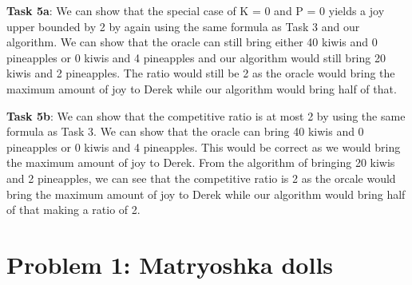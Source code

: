\documentclass[12pt,letterpaper]{article}
\begin{document}
\textbf{Task 5a}: We can show that the special case of K = 0 and P = 0 yields a joy upper
bounded by 2 by again using the same formula as Task 3 and our algorithm. We can show that
the oracle can still bring either 40 kiwis and 0 pineapples or 0 kiwis and 4 pineapples and our
algorithm would still bring 20 kiwis and 2 pineapples. The ratio would still be 2 as the oracle
would bring the maximum amount of joy to Derek while our algorithm would bring half of that.

\textbf{Task 5b}: We can show that the competitive ratio is at most 2 by using the same
formula as Task 3. We can show that the oracle can bring 40 kiwis and 0 pineapples
or 0 kiwis and 4 pineapples. This would be correct as we would bring the maximum amount of
joy to Derek. From the algorithm of bringing 20 kiwis and 2 pineapples, we can see that the
competitive ratio is 2 as the orcale would bring the maximum amount of joy to Derek while our
algorithm would bring half of that making a ratio of 2.




\section*{Problem 1: Matryoshka dolls}
\end{document}
